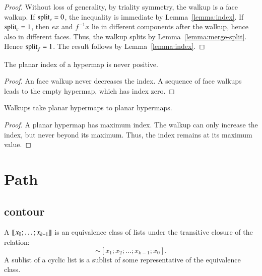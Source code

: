 \begin{proof} Without loss of generality, by triality symmetry, the
walkup is a face walkup.  If ${\operatorname{split}}_c=0$, the inequality is
immediate by Lemma~\ref{lemma:index}.  If ${\operatorname{split}}_c=1$, 
then $e x$ and $f^{-1} x$ lie in
different components after the walkup, hence also in different
faces.  Thus, the walkup splits by Lemma~\ref{lemma:merge-split}.
Hence  ${\operatorname{split}}_f = 1$.  The result
follows by Lemma~\ref{lemma:index}.
\end{proof}


\begin{lemma}
\label{lemma:planar-nonpos}  
The planar index
of a hypermap is never positive.
\end{lemma}

\begin{proof}  An face walkup never decreases the index.  A sequence
of face walkups leads to the empty hypermap, which has
index zero.
\end{proof}


\begin{lemma}
\label{lemma:walkup-planar}
Walkups take planar hypermaps to planar
hypermaps.
\end{lemma}

\begin{proof}  
A planar hypermap has maximum index.  The walkup
can only increase the index, but never beyond its maximum.  
Thus, the index remains at its maximum value.
\end{proof}





\section{Path}

\subsection{contour}

\begin{definition}
A  ${\llbracket{x_0;\ldots;x_{k-1}}\rrbracket}$ is an equivalence class of lists under the transitive closure of the relation:
\begin{displaymath}
[x_0;x_1;x_2\ldots;x_{k-1}] \sim [x_1;x_2;\ldots;x_{k-1};x_0].
\end{displaymath}
A sublist of a cyclic list is a sublist of some representative of the equivalence class.
\end{definition}

